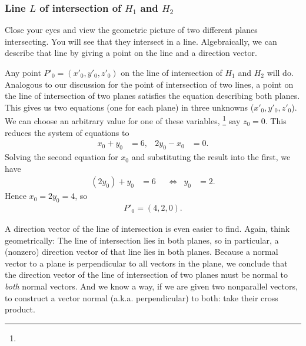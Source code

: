 {\subsubsection{Line $L$ of intersection of $H_{1}$ and $H_{2}$}

Close your eyes and view the geometric picture of two different planes intersecting. You will see that they intersect in a line. Algebraically, we can describe that line by giving a point on the line and a direction vector.

Any point $P'_{0} = (x'_{0},y'_{0},z'_{0})$ on the line of intersection of $H_{1}$ and $H_{2}$ will do. Analogous to our discussion for the point of intersection of two lines, a point on the line of intersection of two planes satisfies the equation describing both planes. This gives us two equations (one for each plane) in three unknowns ($x'_{0},y'_{0},z'_{0}$). We can choose an arbitrary value for one of these variables,%
\footnote{} %
say $z_{0} = 0$. This reduces the system of equations to
\begin{align*}
x_{0} + y_{0}
&=
6,
&
2 y_{0} - x_{0}
&=
0.
\end{align*}
Solving the second equation for $x_{0}$ and substituting the result into the first, we have
\begin{align*}
(2 y_{0}) + y_{0}
&=
6
&
&\Leftrightarrow
&
y_{0}
&=
2.
\end{align*}
Hence $x_{0} = 2 y_{0} = 4$, so
\begin{align*}
P'_{0}
=
(4,2,0).
\end{align*}

A direction vector of the line of intersection is even easier to find. Again, think geometrically: The line of intersection lies in both planes, so in particular, a (nonzero) direction vector of that line lies in both planes. Because a normal vector to a plane is perpendicular to all vectors in the plane, we conclude that the direction vector of the line of intersection of two planes must be normal to \emph{both} normal vectors. And we know a way, if we are given two nonparallel vectors, to construct a vector normal (a.k.a. perpendicular) to both: take their cross product.

}

